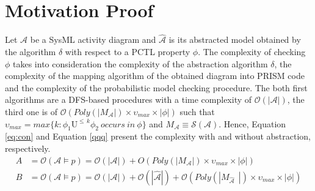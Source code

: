 \section{Motivation Proof}\label{sub:motivation}
Let $\mathcal{A}$ be a SysML activity diagram and $\widehat{\mathcal{A}}$ is its abstracted model obtained by the algorithm $\delta$ with respect to a PCTL property  $\phi$. The complexity of checking $\phi$ takes into consideration the complexity of the abstraction algorithm $\delta$, the complexity of the mapping algorithm of the obtained diagram into PRISM code and the complexity of the probabilistic model checking procedure. The both first algorithms are a DFS-based procedures with a time complexity of $\mathcal{O}(|\mathcal{A}|)$, the third one is of $\mathcal{O}(Poly(|M_{\mathcal{A}}|)\times \upsilon_{max}\times |\phi|)$ such that
$\upsilon_{max}=max\{k:\phi_1\mathrm{U}^{\leq\,k}\phi_2~occurs~in~\phi\}$ and
$M_{\mathcal{A}}\equiv\mathscr{S}(\mathcal{A})$. Hence, Equation \ref{eq:con}  and  Equation \ref{qqq} present the complexity with and without abstraction, respectively.
\begin{align}
A&=\mathcal{O}(\mathcal{A}\models p)=\mathcal{O}(|\mathcal{A}|)+O(Poly(|M_{\mathcal{A}}|)\times \upsilon_{max}\times |\phi|)\label{eq:con}\\
B&=\mathcal{O}(\mathcal{A}\models p)=\mathcal{O}(|\mathcal{A}|)+\mathcal{O}(|\widehat{\mathcal{A}}|)+\mathcal{O}(Poly(|M_{\widehat{\mathcal{A}}}~~|)\times \upsilon_{max}\times |\phi|)\label{qqq}
\end{align}

